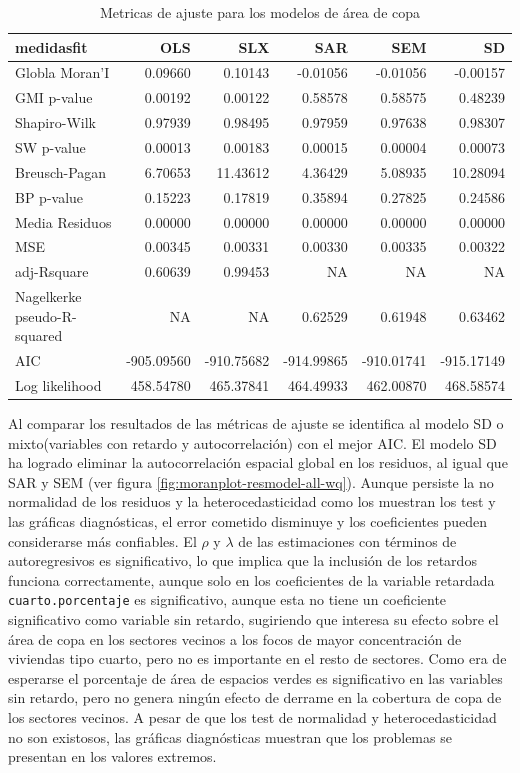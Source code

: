\documentclass[12pt,]{book}
\begin{document}
\begin{table}

\caption{\label{tab:tabla-comp-modelos-copa}Metricas de ajuste para los modelos de área de copa}
\centering
\begin{tabular}[t]{l|r|r|r|r|r}
\hline
medidasfit & OLS & SLX & SAR & SEM & SD\\
\hline
Globla Moran'I & 0.09660 & 0.10143 & -0.01056 & -0.01056 & -0.00157\\
\hline
GMI p-value & 0.00192 & 0.00122 & 0.58578 & 0.58575 & 0.48239\\
\hline
Shapiro-Wilk & 0.97939 & 0.98495 & 0.97959 & 0.97638 & 0.98307\\
\hline
SW p-value & 0.00013 & 0.00183 & 0.00015 & 0.00004 & 0.00073\\
\hline
Breusch-Pagan & 6.70653 & 11.43612 & 4.36429 & 5.08935 & 10.28094\\
\hline
BP p-value & 0.15223 & 0.17819 & 0.35894 & 0.27825 & 0.24586\\
\hline
Media Residuos & 0.00000 & 0.00000 & 0.00000 & 0.00000 & 0.00000\\
\hline
MSE & 0.00345 & 0.00331 & 0.00330 & 0.00335 & 0.00322\\
\hline
adj-Rsquare & 0.60639 & 0.99453 & NA & NA & NA\\
\hline
Nagelkerke pseudo-R-squared & NA & NA & 0.62529 & 0.61948 & 0.63462\\
\hline
AIC & -905.09560 & -910.75682 & -914.99865 & -910.01741 & -915.17149\\
\hline
Log likelihood & 458.54780 & 465.37841 & 464.49933 & 462.00870 & 468.58574\\
\hline
\end{tabular}
\end{table}

Al comparar los resultados de las métricas de ajuste se identifica al
modelo SD o mixto(variables con retardo y autocorrelación) con el mejor
AIC. El modelo SD ha logrado eliminar la autocorrelación espacial global
en los residuos, al igual que SAR y SEM (ver figura
\ref{fig:moranplot-resmodel-all-wq}). Aunque persiste la no normalidad
de los residuos y la heterocedasticidad como los muestran los test y las
gráficas diagnósticas, el error cometido disminuye y los coeficientes
pueden considerarse más confiables. El \(\rho\) y \(\lambda\) de las
estimaciones con términos de autoregresivos es significativo, lo que
implica que la inclusión de los retardos funciona correctamente, aunque
solo en los coeficientes de la variable retardada
\texttt{cuarto.porcentaje} es significativo, aunque esta no tiene un
coeficiente significativo como variable sin retardo, sugiriendo que
interesa su efecto sobre el área de copa en los sectores vecinos a los
focos de mayor concentración de viviendas tipo cuarto, pero no es
importante en el resto de sectores. Como era de esperarse el porcentaje
de área de espacios verdes es significativo en las variables sin
retardo, pero no genera ningún efecto de derrame en la cobertura de copa
de los sectores vecinos. A pesar de que los test de normalidad y
heterocedasticidad no son existosos, las gráficas diagnósticas muestran
que los problemas se presentan en los valores extremos.
\end{document}
